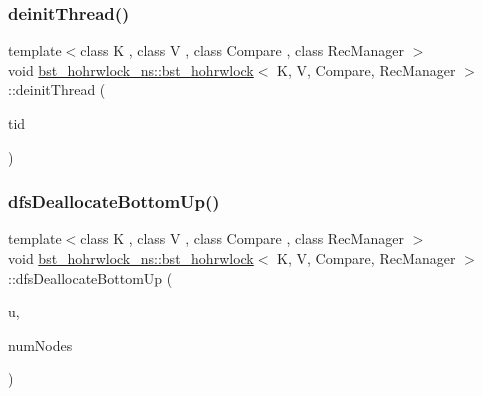\mbox{\label{classbst__hohrwlock__ns_1_1bst__hohrwlock_a6238bfcad20d51e4b3522a51c9b41021}} 
\subsubsection{\texorpdfstring{deinit\+Thread()}{deinitThread()}}
{\footnotesize\ttfamily template$<$class K , class V , class Compare , class Rec\+Manager $>$ \\
void \hyperlink{classbst__hohrwlock__ns_1_1bst__hohrwlock}{bst\+\_\+hohrwlock\+\_\+ns\+::bst\+\_\+hohrwlock}$<$ K, V, Compare, Rec\+Manager $>$\+::deinit\+Thread (\begin{DoxyParamCaption}\item[{const int}]{tid }\end{DoxyParamCaption})\hspace{0.3cm}{\ttfamily [inline]}}

\mbox{\label{classbst__hohrwlock__ns_1_1bst__hohrwlock_a12610932b03346ccdbeeff626d8ad4a6}} 
\subsubsection{\texorpdfstring{dfs\+Deallocate\+Bottom\+Up()}{dfsDeallocateBottomUp()}}
{\footnotesize\ttfamily template$<$class K , class V , class Compare , class Rec\+Manager $>$ \\
void \hyperlink{classbst__hohrwlock__ns_1_1bst__hohrwlock}{bst\+\_\+hohrwlock\+\_\+ns\+::bst\+\_\+hohrwlock}$<$ K, V, Compare, Rec\+Manager $>$\+::dfs\+Deallocate\+Bottom\+Up (\begin{DoxyParamCaption}\item[{\hyperlink{bst__rwlock__impl_8h_a04158d2a20768fe447133ff555823b05}{nodeptr} const}]{u,  }\item[{int $\ast$}]{num\+Nodes }\end{DoxyParamCaption})\hspace{0.3cm}{\ttfamily [inline]}}

